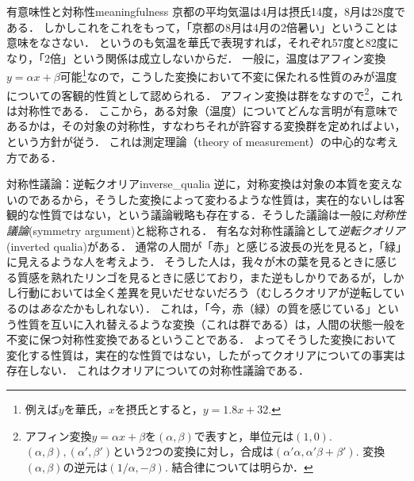 \documentclass[11pt,a4paper]{jsarticle}
\begin{document}
\begin{rei}{有意味性と対称性}{meaningfulness}
京都の平均気温は4月は摂氏14度，8月は28度である．
しかしこれをこれをもって，「京都の8月は4月の2倍暑い」ということは意味をなさない．
というのも気温を華氏で表現すれば，それぞれ57度と82度になり，「2倍」という関係は成立しないからだ．
一般に，温度はアフィン変換$y = \alpha x + \beta$可能\footnote{例えば$y$を華氏，$x$を摂氏とすると，$y = 1.8x+32$.}なので，こうした変換において不変に保たれる性質のみが温度についての客観的性質として認められる．
アフィン変換は群をなすので\footnote{アフィン変換$y=\alpha x + \beta$を$(\alpha, \beta)$で表すと，単位元は$(1,0)$. $(\alpha, \beta), (\alpha',\beta')$という2つの変換に対し，合成は$(\alpha' \alpha, \alpha' \beta + \beta')$. 変換$(\alpha, \beta)$の逆元は$(1/\alpha, -\beta)$. 結合律については明らか．}，これは対称性である．
ここから，ある対象（温度）についてどんな言明が有意味であるかは，その対象の対称性，すなわちそれが許容する変換群を定めればよい，という方針が従う．
これは測定理論（theory of measurement）の中心的な考え方である\citep[e.g,][]{Narens2007-ty}．
\end{rei}


\begin{rei}{対称性議論：逆転クオリア}{inverse_qualia}
逆に，対称変換は対象の本質を変えないのであるから，そうした変換によって変わるような性質は，実在的ないしは客観的な性質ではない，という議論戦略も存在する．そうした議論は一般に\emph{対称性議論}(symmetry argument)と総称される．
有名な対称性議論として\emph{逆転クオリア}(inverted qualia)がある．
通常の人間が「赤」と感じる波長の光を見ると，「緑」に見えるような人を考えよう．
そうした人は，我々が木の葉を見るときに感じる質感を熟れたリンゴを見るときに感じており，また逆もしかりであるが，しかし行動においては全く差異を見いだせないだろう（むしろクオリアが逆転しているのは\emph{あなた}かもしれない）．
これは，「今，赤（緑）の質を感じている」という性質を互いに入れ替えるような変換（これは群である）は，人間の状態一般を不変に保つ対称性変換であるということである．
よってそうした変換において変化する性質は，実在的な性質ではない，したがってクオリアについての事実は存在しない．
これはクオリアについての対称性議論である．
\end{rei}
\end{document}
